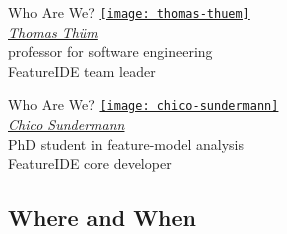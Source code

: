 \begin{frame}{\myframetitle}
	\begin{mycolumns}[animation=none]
		\begin{note}{Who Are We?}
			\centering
			\href{https://www.uni-ulm.de/en/in/sp/team/thuem/}{\texttt{[image: thomas-thuem]}}\\[.5ex]
			\href{https://www.uni-ulm.de/en/in/sp/team/thuem/}{\emph{Thomas Thüm}}\\[.5ex]
			\small professor for software engineering\\[.5ex]
			FeatureIDE team leader
		\end{note}
	\mynextcolumn
		\begin{note}{Who Are We?}
			\centering
			\href{https://www.uni-ulm.de/en/in/sp/team/chico-sundermann/}{\texttt{[image: chico-sundermann]}}\\[.5ex]
			\href{https://www.uni-ulm.de/en/in/sp/team/chico-sundermann/}{\emph{Chico Sundermann}}\\[.5ex]
			\small PhD student in feature-model analysis\\[.5ex]
			FeatureIDE core developer
		\end{note}
	\end{mycolumns}
\end{frame}

\subsection{Where and When}

